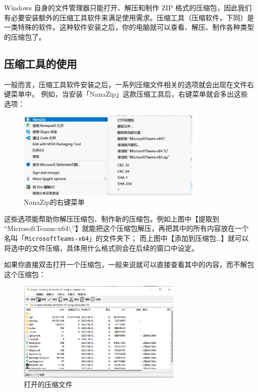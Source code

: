Windows 自身的文件管理器只能打开、解压和制作 ZIP 格式的压缩包，因此我们有必要安装额外的压缩工具软件来满足使用需求。压缩工具（压缩软件，下同）是一类特殊的软件。这种软件安装之后，你的电脑就可以查看、解压、制作各种类型的压缩包了。

\subsection{压缩工具的使用}

一般而言，压缩工具软件安装之后，一系列压缩文件相关的选项就会出现在文件右键菜单中。
例如，当安装「NanaZip」这款压缩工具后，右键菜单就会多出这些选项：

\begin{figure}[htb!]
  \centering
  \includegraphics[width=9cm]{assets/Nanazip_Right_Click.jpg}
  \caption{NanaZip的右键菜单}
  \label{Nanazip_Right_Click}
\end{figure}

这些选项能帮助你解压压缩包、制作新的压缩包。例如上图中【提取到 “MicrosoftTeams-x64\textbackslash ”】就能把这个压缩包解压，再把其中的所有内容放在一个名叫「\verb|MicrosoftTeams-x64|」的文件夹下；
而上图中【添加到压缩包…】就可以将选中的文件压缩，具体用什么格式则会在后续的窗口中设定。

如果你直接双击打开一个压缩包，一般来说就可以直接查看其中的内容，而不解包这个压缩包：

\begin{figure}[htb!]
  \centering
  \includegraphics[width=8cm]{assets/Nanazip_View.png}
  \caption{打开的压缩文件}
  \label{Nanazip_View}
\end{figure}

